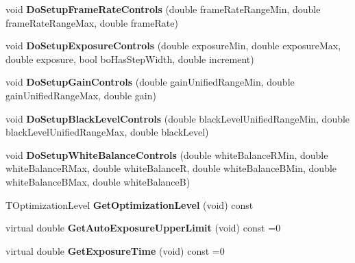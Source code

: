 \begin{DoxyCompactItemize}
\item 
\hypertarget{class_wizard_quick_setup_a9f07005b3fbb548921bcb680cab21fc6}{void {\bfseries Do\+Setup\+Frame\+Rate\+Controls} (double frame\+Rate\+Range\+Min, double frame\+Rate\+Range\+Max, double frame\+Rate)}\label{class_wizard_quick_setup_a9f07005b3fbb548921bcb680cab21fc6}

\item 
\hypertarget{class_wizard_quick_setup_ab1b5d367f419458b45676207312f341d}{void {\bfseries Do\+Setup\+Exposure\+Controls} (double exposure\+Min, double exposure\+Max, double exposure, bool bo\+Has\+Step\+Width, double increment)}\label{class_wizard_quick_setup_ab1b5d367f419458b45676207312f341d}

\item 
\hypertarget{class_wizard_quick_setup_a23d655a3519d628efb4bee30d8e34d68}{void {\bfseries Do\+Setup\+Gain\+Controls} (double gain\+Unified\+Range\+Min, double gain\+Unified\+Range\+Max, double gain)}\label{class_wizard_quick_setup_a23d655a3519d628efb4bee30d8e34d68}

\item 
\hypertarget{class_wizard_quick_setup_a691b3177a1ea869148724945deffe748}{void {\bfseries Do\+Setup\+Black\+Level\+Controls} (double black\+Level\+Unified\+Range\+Min, double black\+Level\+Unified\+Range\+Max, double black\+Level)}\label{class_wizard_quick_setup_a691b3177a1ea869148724945deffe748}

\item 
\hypertarget{class_wizard_quick_setup_ad01ad7524695d25c150acba33773ba98}{void {\bfseries Do\+Setup\+White\+Balance\+Controls} (double white\+Balance\+R\+Min, double white\+Balance\+R\+Max, double white\+Balance\+R, double white\+Balance\+B\+Min, double white\+Balance\+B\+Max, double white\+Balance\+B)}\label{class_wizard_quick_setup_ad01ad7524695d25c150acba33773ba98}

\item 
\hypertarget{class_wizard_quick_setup_a8b06b1986e9f92f1949b30b7ed352744}{T\+Optimization\+Level {\bfseries Get\+Optimization\+Level} (void) const }\label{class_wizard_quick_setup_a8b06b1986e9f92f1949b30b7ed352744}

\item 
\hypertarget{class_wizard_quick_setup_a75e00873ac3032f5e816c0dda5db0339}{virtual double {\bfseries Get\+Auto\+Exposure\+Upper\+Limit} (void) const =0}\label{class_wizard_quick_setup_a75e00873ac3032f5e816c0dda5db0339}

\item 
\hypertarget{class_wizard_quick_setup_a9d77c4477aac6fa850e632d7a65b2b2b}{virtual double {\bfseries Get\+Exposure\+Time} (void) const =0}\label{class_wizard_quick_setup_a9d77c4477aac6fa850e632d7a65b2b2b}


\end{DoxyCompactItemize}

